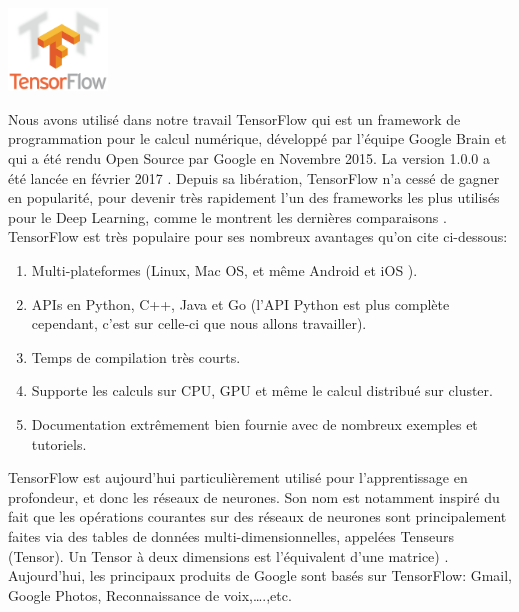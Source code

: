 \documentclass[12pt]{report}
\begin{document}
\begin{center}
\includegraphics[width=100]{tonosr.png}
\end{center}


Nous avons utilisé dans notre travail TensorFlow qui est un framework de programmation pour le calcul numérique, développé par l'équipe Google Brain et qui a été rendu Open Source par Google en Novembre 2015. La version 1.0.0 a été lancée en février 2017  \cite{ref36}.
Depuis sa libération, TensorFlow n'a cessé de gagner en popularité, pour devenir très rapidement l'un des frameworks les plus utilisés pour le Deep Learning, comme le montrent les dernières comparaisons \cite{ref37}.\\
TensorFlow est très populaire pour ses nombreux avantages qu'on cite ci-dessous:
\begin{enumerate}
\item Multi-plateformes (Linux, Mac OS, et même Android et iOS ).
\item APIs en Python, C++, Java et Go (l’API Python est plus complète cependant, c’est sur celle-ci que nous allons travailler).
\item Temps de compilation très courts.
\item Supporte les calculs sur CPU, GPU et même le calcul distribué sur cluster.
\item Documentation extrêmement bien fournie avec de nombreux exemples et tutoriels.
\end{enumerate}
TensorFlow est aujourd'hui particulièrement utilisé pour l'apprentissage en profondeur, et donc les réseaux de neurones. Son nom est notamment inspiré du fait que les opérations courantes sur des réseaux de neurones sont principalement faites via des tables de données multi-dimensionnelles, appelées Tenseurs (Tensor). Un Tensor à deux dimensions est l'équivalent d’une matrice)  \cite{ref37}.\\
Aujourd'hui, les principaux produits de Google sont basés sur TensorFlow: Gmail, Google Photos, Reconnaissance de voix,….,etc.


\newpage


\end{document}
